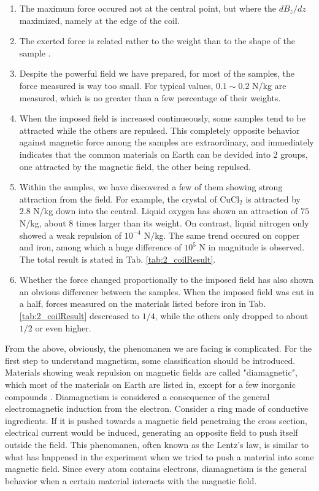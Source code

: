 \begin{enumerate}
  \item The maximum force occured not at the central point, but where the $dB_z/dz$ maximized, namely at the edge of the coil.
  \item The exerted force is related rather to the weight than to the shape of the sample .
  \item Despite the powerful field we have prepared, for most of the samples, the force measured is way too small.
  For typical values, $0.1\sim0.2$ N/kg are measured, which is no greater than a few percentage of their weights.
  \item When the imposed field is increased continueously, some samples tend to be attracted while the others are repulsed.
  This completely opposite behavior against magnetic force among the samples are extraordinary,
  and immediately indicates that the common materials on Earth can be devided into 2 groups,
  one attracted by the magnetic field, the other being repulsed.
  \item Within the samples, we have discovered a few of them showing strong attraction from the field.
  For example, the crystal of $\mathrm{CuCl_2}$ is attracted by $2.8$ N/kg down into the central.
  Liquid oxygen has shown an attraction of $75$ N/kg, about 8 times larger than its weight.
  On contrast, liquid nitrogen only showed a weak repulsion of $10^{-4}$ N/kg.
  The same trend occured on copper and iron, among which a huge difference of $10^5$ N in magnitude is observed.
  The total result is stated in Tab. \ref{tab:2_coilResult}.
  \item Whether the force changed proportionally to the imposed field has also shown an obvious difference between the samples.
  When the imposed field was cut in a half,
  forces measured on the materials listed before iron in Tab. \ref{tab:2_coilResult} descreased to $1/4$,
  while the others only dropped to about $1/2$ or even higher.
\end{enumerate}

From the above, obviously, the phenomanen we are facing is complicated.
For the first step to understand magnetism, some classification should be introduced.
Materials showing weak repulsion on magnetic fields are called "diamagnetic",
which most of the materials on Earth are listed in, except for a few inorganic compounds \cite{2_13}.
Diamagnetism is considered a consequence of the general electromagnetic induction from the electron.
Consider a ring made of conductive ingredients.
If it is pushed towards a magnetic field penetraing the cross section, electrical current would be induced,
generating an opposite field to push itself outside the field.
This phenomanen, often known as the Lentz's law,
is similar to what has happened in the experiment when we tried to push a material into some magnetic field.
Since every atom contains electrons, diamagnetism is the general behavior when a certain material interacts with the magnetic field.

